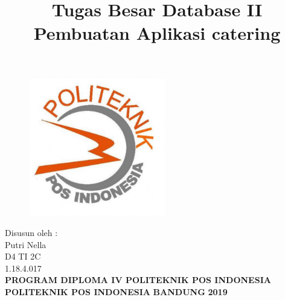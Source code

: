 \documentclass[a4paper, 12pt]{article}
\begin{document}
\title{\huge\textbf{Tugas Besar Database II \\
Pembuatan Aplikasi catering}}
\date{}

\maketitle


\begin{figure}[!ht]
\begin{center}
\includegraphics[width = 6cm, height = 6cm]{poltekpos.JPG}
\end{center}
\end{figure}

\begin{center}
\vspace{1cm}
Disusun oleh :\\
Putri Nella\\
D4 TI 2C\\
1.18.4.017\\
\vspace{1cm}
\textbf{PROGRAM DIPLOMA IV POLITEKNIK POS INDONESIA} \linebreak
\textbf{POLITEKNIK POS INDONESIA} \linebreak
\textbf{BANDUNG}\linebreak
\textbf{2019}

\end{center}


\thispagestyle{empty}


\end{document}
